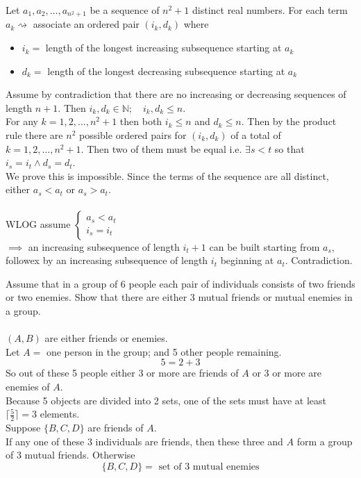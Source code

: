 \documentclass[letterpaper, 12pt]{article}
\newenvironment{proof}[1][Proof]{\begin{trivlist}
\item[\hskip \labelsep {\bfseries #1}]}{\end{trivlist}}
\newenvironment{example}[1][Example]{\begin{trivlist}
\item[\hskip \labelsep {\bfseries #1}]}{\end{trivlist}}
\newcommand{\N}{\mathbb{N}}
\newcommand{\0}{\emptyset}
\begin{document}
    \begin{proof}
        Let $a_1, a_2, \dots, a_{n^2 + 1}$ be a sequence of $n^2 + 1$ distinct real numbers. 
        For each term $a_k \rightsquigarrow$ associate an ordered pair $(i_k, d_k)$ where 
        \begin{itemize}
            \item $i_k =$ length of the longest increasing subsequence starting at $a_k$
            \item $d_k =$ length of the longest decreasing subsequence starting at $a_k$
        \end{itemize}
        Assume by contradiction that there are no increasing or decreasing sequences of length 
        $n+1$. Then $i_k, d_k \in \N; \quad i_k, d_k \le n$. \\
        For any $k=1,2,\dots,n^2+1$ then both $i_k \le n$ and $d_k \le n$. Then by the product 
        rule there are $n^2$ possible ordered pairs for $(i_k, d_k)$ of a total of 
        $k=1,2,\dots,n^2+1$. Then two of them must be equal i.e. $\exists s < t$ so that 
        $i_s = i_t \wedge d_s = d_t$. \\
        We prove this is impossible. Since the terms of the sequence are all distinct, either 
        $a_s < a_t$ or $a_s > a_t$. \\
        \\
        WLOG assume $\begin{cases}
            a_s < a_t \\
            i_s = i_t
        \end{cases}$ \\
        $\implies$ an increasing subsequence of length $i_t+1$ can be built starting from $a_s$, 
        followex by an increasing subsequence of length $i_t$ beginning at $a_t$. Contradiction.
    \end{proof}
    \begin{example}
        Assume that in a group of 6 people each pair of individuals consists of two friends or 
        two enemies. Show that there are either 3 mutual friends or mutual enemies in a group. \\
        \\
        $(A, B)$ are either friends or enemies. \\
        Let $A =$ one person in the group; and 5 other people remaining.
        \[5 = 2+3\]
        So out of these 5 people either 3 or more are friends of $A$ or 3 or more are enemies of $A$. \\
        Because 5 objects are divided into 2 sets, one of the sets must have at least 
        $\lceil \frac{5}{2} \rceil = 3$ elements. \\
        Suppose $\{B,C,D\}$ are friends of $A$. \\
        If any one of these 3 individuals are friends, then these three and $A$ form a group of 
        3 mutual friends. Otherwise
        \[\{B,C,D\} = \text{ set of 3 mutual enemies}\]
    \end{example}
\end{document}
